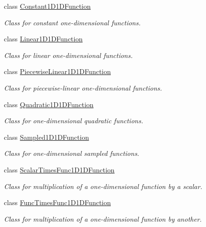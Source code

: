 \begin{DoxyCompactItemize}
class \hyperlink{class_q_u_e_s_o_1_1_constant1_d1_d_function}{Constant1\-D1\-D\-Function}
\begin{DoxyCompactList}\small\item\em Class for constant one-\/dimensional functions. \end{DoxyCompactList}\item 
class \hyperlink{class_q_u_e_s_o_1_1_linear1_d1_d_function}{Linear1\-D1\-D\-Function}
\begin{DoxyCompactList}\small\item\em Class for linear one-\/dimensional functions. \end{DoxyCompactList}\item 
class \hyperlink{class_q_u_e_s_o_1_1_piecewise_linear1_d1_d_function}{Piecewise\-Linear1\-D1\-D\-Function}
\begin{DoxyCompactList}\small\item\em Class for piecewise-\/linear one-\/dimensional functions. \end{DoxyCompactList}\item 
class \hyperlink{class_q_u_e_s_o_1_1_quadratic1_d1_d_function}{Quadratic1\-D1\-D\-Function}
\begin{DoxyCompactList}\small\item\em Class for one-\/dimensional quadratic functions. \end{DoxyCompactList}\item 
class \hyperlink{class_q_u_e_s_o_1_1_sampled1_d1_d_function}{Sampled1\-D1\-D\-Function}
\begin{DoxyCompactList}\small\item\em Class for one-\/dimensional sampled functions. \end{DoxyCompactList}\item 
class \hyperlink{class_q_u_e_s_o_1_1_scalar_times_func1_d1_d_function}{Scalar\-Times\-Func1\-D1\-D\-Function}
\begin{DoxyCompactList}\small\item\em Class for multiplication of a one-\/dimensional function by a scalar. \end{DoxyCompactList}\item 
class \hyperlink{class_q_u_e_s_o_1_1_func_times_func1_d1_d_function}{Func\-Times\-Func1\-D1\-D\-Function}
\begin{DoxyCompactList}\small\item\em Class for multiplication of a one-\/dimensional function by another. \end{DoxyCompactList}\item 

\end{DoxyCompactItemize}
